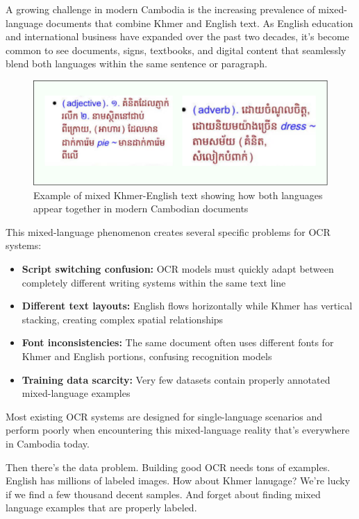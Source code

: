 A growing challenge in modern Cambodia is the increasing prevalence of mixed-language 
documents that combine Khmer and English text. As English education and international 
business have expanded over the past two decades, it's become common to see documents, 
signs, textbooks, and digital content that seamlessly blend both languages within the 
same sentence or paragraph.

\begin{figure}[H]
    \centering
    \includegraphics[width=\textwidth]{figures/mix_language_khmer_and_english.png}
    \caption{Example of mixed Khmer-English text showing how both languages appear together in modern Cambodian documents}
    \label{fig:mix_language}
\end{figure}

This mixed-language phenomenon creates several specific problems for OCR systems:
\begin{itemize}
    \item \textbf{Script switching confusion:} OCR models must quickly adapt between completely different writing systems within the same text line
    \item \textbf{Different text layouts:} English flows horizontally while Khmer has vertical stacking, creating complex spatial relationships
    \item \textbf{Font inconsistencies:} The same document often uses different fonts for Khmer and English portions, confusing recognition models
    \item \textbf{Training data scarcity:} Very few datasets contain properly annotated mixed-language examples
\end{itemize}

Most existing OCR systems are designed for single-language scenarios 
and perform poorly when encountering this mixed-language reality 
that's everywhere in Cambodia today.

Then there's the data problem. Building good OCR needs tons of 
examples. English has millions of labeled images. How about Khmer lanugage? 
We're lucky if we find a few thousand decent samples. And forget 
about finding mixed language examples that are properly labeled.

